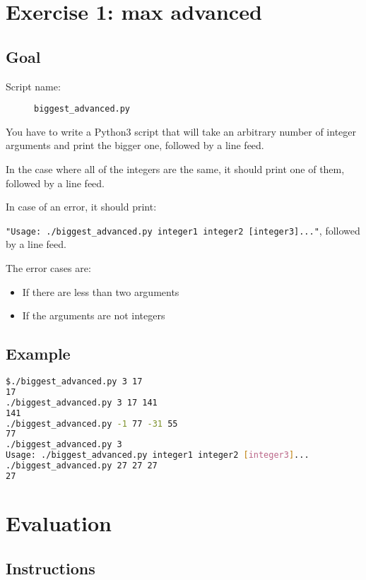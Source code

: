 \documentclass[12pt]{article}
\begin{document}
\section{Exercise 1: max advanced}

\subsection{Goal}

\begin{description}
        \item[Script name:] \texttt{biggest\_advanced.py}
\end{description}

You have to write a Python3 script that will take an arbitrary number of integer arguments and print the bigger one, followed by a line feed.

In the case where all of the integers are the same, it should print one of them, followed by a line feed.

In case of an error, it should print:

\texttt{"Usage: ./biggest\_advanced.py integer1 integer2 [integer3]..."}, followed by a line feed.

The error cases are:

\begin{itemize}
	\item If there are less than two arguments
	\item If the arguments are not integers
\end{itemize}

\subsection{Example}

\begin{lstlisting}[language=bash]
$./biggest_advanced.py 3 17
17
./biggest_advanced.py 3 17 141
141
./biggest_advanced.py -1 77 -31 55
77
./biggest_advanced.py 3
Usage: ./biggest_advanced.py integer1 integer2 [integer3]...
./biggest_advanced.py 27 27 27
27
\end{lstlisting}

\section{Evaluation}
\subsection{Instructions}
\end{document}
